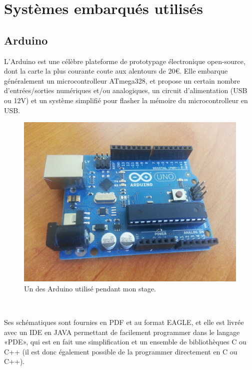 \documentclass{article}
\begin{document}
\clearpage

\appendix
\section{Systèmes embarqués utilisés}

\subsection{Arduino}
\label{arduino}

L’Arduino est une célèbre plateforme de prototypage électronique open-source, dont la carte la plus courante coute aux alentours de 20€.
Elle embarque généralement un microcontrolleur ATmega328, et propose un certain nombre d’entrées/sorties numériques et/ou analogiques, un circuit d’alimentation (USB ou 12V) et un système simplifié pour flasher la mémoire du microcontrolleur en USB.


\begin{figure}[h!]
    \centering\includegraphics[width=\linewidth/2]{img/arduino.jpg}
    \caption{Un des Arduino utilisé pendant mon stage.}
\end{figure}

~

Ses schématiques sont fournies en PDF et au format EAGLE, et elle est livrée avec un IDE en JAVA permettant de facilement programmer dans le langage «PDE», qui est en fait une simplification et un ensemble de bibliothèques C ou C++ (il est donc également possible de la programmer directement en C ou C++).
\end{document}
